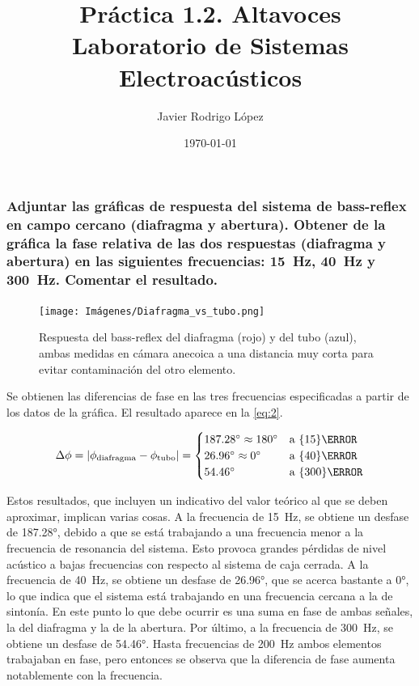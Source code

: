 \documentclass[10pt]{article}
\title{\Huge Práctica 1.2. Altavoces \\\huge Laboratorio de Sistemas Electroacústicos}
\author{Javier Rodrigo López}
\date{\today}
\begin{document}
\maketitle
\setcounter{subsubsection}{8}

\subsubsection{Adjuntar las gráficas de respuesta del sistema de bass-reflex en campo cercano (diafragma y abertura). Obtener de la gráfica la fase relativa de las dos respuestas (diafragma y abertura) en las siguientes frecuencias: \qty{15}{\hertz }, \qty{40}{\hertz } y \qty{300}{\hertz }. Comentar el resultado.}

\begin{figure}[hbtp]
  \centering
  \texttt{[image: Imágenes/Diafragma\_vs\_tubo.png]}
  \caption{Respuesta del bass-reflex del diafragma (rojo) y del tubo (azul), ambas medidas en cámara anecoica a una distancia muy corta para evitar contaminación del otro elemento.}
  \label{fig:Diafragma_vs_tubo.png}
\end{figure}

Se obtienen las diferencias de fase en las tres frecuencias especificadas a partir de los datos de la gráfica. El resultado aparece en la \autoref{eq:2}.

\begin{equation} \label{eq:2}
  \Delta \phi = \abs{\phi_{\text{diafragma}} - \phi_{\text{tubo}}} = \begin{cases}
    \ang{187,28} \approx \ang{180} & \text{a }\qty{15}{\hertz }  \\
    \ang{26,96}  \approx \ang{0}   & \text{a }\qty{40}{\hertz }  \\
    \ang{54.46}                    & \text{a }\qty{300}{\hertz }
  \end{cases}
\end{equation}

Estos resultados, que incluyen un indicativo del valor teórico al que se deben aproximar, implican varias cosas. A la frecuencia de \qty{15}{\hertz }, se obtiene un desfase de \ang{187.28}, debido a que se está trabajando a una frecuencia menor a la frecuencia de resonancia del sistema. Esto provoca grandes pérdidas de nivel acústico a bajas frecuencias con respecto al sistema de caja cerrada. A la frecuencia de \qty{40}{\hertz }, se obtiene un desfase de \ang{26.96}, que se acerca bastante a \ang{0}, lo que indica que el sistema está trabajando en una frecuencia cercana a la de sintonía. En este punto lo que debe ocurrir es una suma en fase de ambas señales, la del diafragma y la de la abertura. Por último, a la frecuencia de \qty{300}{\hertz }, se obtiene un desfase de \ang{54.46}. Hasta frecuencias de \qty{200}{\hertz } ambos elementos trabajaban en fase, pero entonces se observa que la diferencia de fase aumenta notablemente con la frecuencia.
\end{document}
